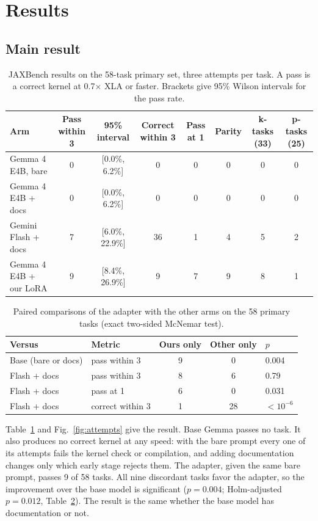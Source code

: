 \documentclass[conference]{IEEEtran}
\newcommand{\x}{$\times$}
\begin{document}
\section{Results}
\label{sec:results}

\subsection{Main result}

\begin{table}[t]
\caption{JAXBench results on the 58-task primary set, three attempts per task. A pass is a correct kernel at 0.7\x{} XLA or
faster. Brackets give 95\% Wilson intervals for the pass rate.}
\label{tab:main}
\centering
\begin{tabular}{@{}lccccccc@{}}
\toprule
Arm & Pass within 3 & 95\% interval & Correct within 3 & Pass at 1 & Parity & k-tasks (33) & p-tasks (25) \\
\midrule
Gemma 4 E4B, bare & 0 & [0.0\%, 6.2\%] & 0 & 0 & 0 & 0 & 0 \\
Gemma 4 E4B + docs & 0 & [0.0\%, 6.2\%] & 0 & 0 & 0 & 0 & 0 \\
Gemini Flash + docs & 7 & [6.0\%, 22.9\%] & 36 & 1 & 4 & 5 & 2 \\
Gemma 4 E4B + our LoRA & 9 & [8.4\%, 26.9\%] & 9 & 7 & 9 & 8 & 1 \\
\bottomrule
\end{tabular}
\end{table}

\begin{table}[t]
\caption{Paired comparisons of the adapter with the other arms on the 58 primary tasks (exact two-sided McNemar test).}
\label{tab:mcnemar}
\centering
\small\setlength{\tabcolsep}{3pt}
\begin{tabular}{@{}llccl@{}}
\toprule
Versus & Metric & Ours only & Other only & $p$ \\
\midrule
Base (bare or docs) & pass within 3 & 9 & 0 & 0.004 \\
Flash + docs & pass within 3 & 8 & 6 & 0.79 \\
Flash + docs & pass at 1 & 6 & 0 & 0.031 \\
Flash + docs & correct within 3 & 1 & 28 & $<10^{-6}$ \\
\bottomrule
\end{tabular}
\end{table}

Table~\ref{tab:main} and Fig.~\ref{fig:attempts} give the result. Base Gemma passes no task. It also produces no correct kernel
at any speed: with the bare prompt every one of its attempts fails the kernel check or compilation, and adding documentation
changes only which early stage rejects them. The adapter, given the same bare prompt, passes 9 of 58 tasks. All nine discordant
tasks favor the adapter, so the improvement over the base model is significant ($p = 0.004$; Holm-adjusted $p = 0.012$,
Table~\ref{tab:mcnemar}). The result is the same whether the base model has documentation or not.
\end{document}
